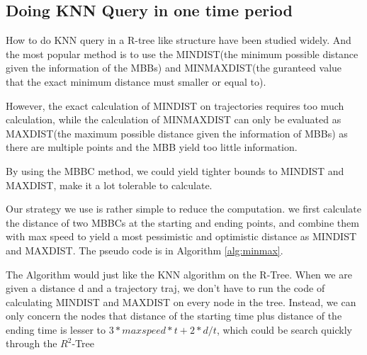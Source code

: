 \documentclass[sigplan]{acmart}
\begin{document}
\subsection{Doing KNN Query in one time period}
How to do KNN query in a R-tree like structure have been studied widely.\cite{roussopoulos1995nearest} And the most popular method is to use the MINDIST(the minimum possible distance given the information of the MBBs) and MINMAXDIST(the guranteed value that the exact minimum distance must smaller or equal to).\par
However, the exact calculation of MINDIST on trajectories requires too much calculation, while the calculation of MINMAXDIST can only be evaluated as MAXDIST(the maximum possible distance given the information of MBBs) as there are multiple points and the MBB yield too little information.\par
By using the MBBC method, we could yield tighter bounds to MINDIST and MAXDIST, make it a lot tolerable to calculate. \par
Our strategy we use is rather simple to reduce the computation. we first calculate the distance of two MBBCs at the starting and ending points, and combine them with max speed to yield a most pessimistic and optimistic distance as MINDIST and MAXDIST. The pseudo code is in Algorithm \ref{alg:minmax}.\par
The Algorithm would just like the KNN algorithm on the R-Tree. When we are given a distance d and a trajectory traj, we don't have to run the code of calculating MINDIST and MAXDIST on every node in the tree. Instead, we can only concern the nodes that distance of the starting time plus distance of the ending time is lesser to $3* maxspeed* t + 2*d/t$, which could be search quickly through the $R^2$-Tree
\end{document}

